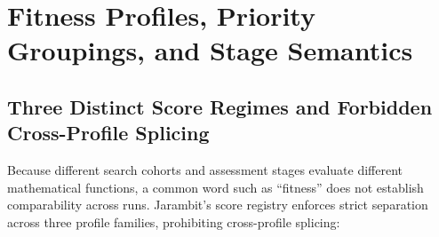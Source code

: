 \section{Fitness Profiles, Priority Groupings, and Stage Semantics}
\label{sec:fitness}

\subsection{Three Distinct Score Regimes and Forbidden Cross-Profile Splicing}
Because different search cohorts and assessment stages evaluate different mathematical functions, a common word such as ``fitness'' does not establish comparability across runs. Jarambit's score registry enforces strict separation across three profile families, prohibiting cross-profile splicing:
